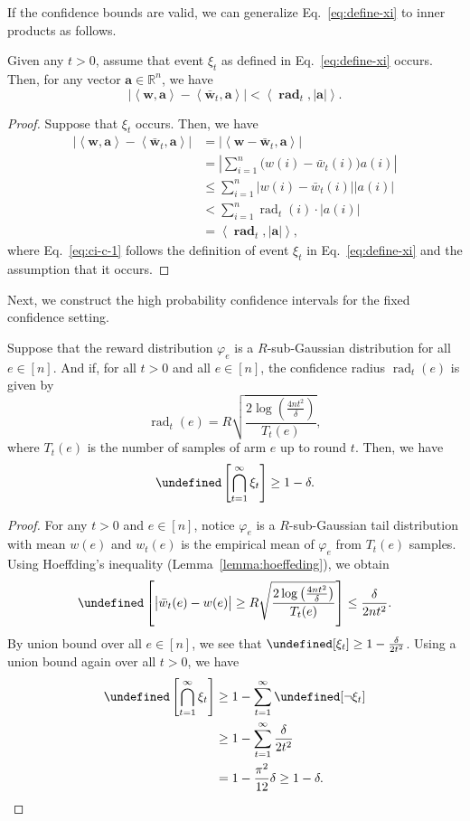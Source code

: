 \documentclass{article}
\newcommand{\Rew}{\varphi}
\newcommand{\RR}{\mathbb R}
\DeclareMathOperator{\rad}{rad}
\let\Pr\undefined
\DeclareMathOperator{\Pr}{Pr}
\newcommand{\inn}[1]{\left\langle #1 \right\rangle}
\renewcommand{\vec}[1]{\boldsymbol{#1}}
\begin{document}
If the confidence bounds are valid, we can generalize Eq.~\eqref{eq:define-xi} to inner products as follows.
\begin{lemma}
\label{lemma:ci-property}
Given any $t>0$, assume that event $\xi_t$ as defined in Eq.~\eqref{eq:define-xi} occurs. 
Then, for any vector $\vec a \in \RR^n$, we have
$$
\big|\inn{\vec w,\vec a} - \inn{\vec {\bar w}_t, \vec a}\big| < \inn{\vec \rad_t, |\vec a|}.
$$
\end{lemma}

\begin{proof}
Suppose that $\xi_t$ occurs. Then, we have
\begin{align}
\big|\inn{\vec w,\vec a} - \inn{\vec {\bar w}_t, \vec a}\big| 
&=\big|\inn{\vec w-\vec {\bar w}_t,\vec a}\big| \nonumber \\
&=\left|\sum_{i=1}^n \big(w(i)-\bar w_t(i)\big) a(i)  \right| \nonumber \\
&\le\sum_{i=1}^n \big| w(i)-\bar w_t(i)\big| |a(i)| \nonumber \\
&< \sum_{i=1}^{n} \rad_t(i) \cdot |a(i)| \label{eq:ci-c-1}\\
&= \inn{\vec \rad_t,  |\vec a|}, \nonumber
\end{align}
where Eq.~\eqref{eq:ci-c-1} follows the definition of event $\xi_t$ in Eq.~\eqref{eq:define-xi} and the assumption that it occurs.
\end{proof}


Next, we construct the high probability confidence intervals for the fixed confidence setting.
\begin{lemma}
\label{lemma:ci}
Suppose that the reward distribution $\Rew_e$ is a $R$-sub-Gaussian distribution for all $e\in [n]$.
And if, for all $t>0$ and all $e\in [n]$, 
the confidence radius $\rad_t(e)$ is given by
$$
\rad_t(e) = R\sqrt{\frac{2\log\left(\frac{4n t^2}\delta\right)}{T_t(e)}},
$$
where $T_t(e)$ is the number of samples of arm $e$ up to round $t$.
Then, we have
$$
\Pr\left[\bigcap_{t=1}^\infty \xi_t \right] \ge 1-\delta.
$$
\end{lemma}

\begin{proof}
For any $t>0$ and $e\in [n]$, notice $\Rew_e$ is a $R$-sub-Gaussian tail distribution with mean $w(e)$ and $w_t(e)$ is the empirical mean of $\Rew_e$ from $T_t(e)$ samples. 
Using Hoeffding's inequality (Lemma~\ref{lemma:hoeffeding}), we obtain
$$
\Pr\left[ \big|\bar w_t(e)-w(e) \big| \ge R\sqrt{\frac{2\log\left(\frac{4n t^2}\delta\right)}{T_t(e)}} \right] \le \frac{\delta}{2nt^2}.
$$
By union bound over all $e\in [n]$, we see that $\Pr[\xi_t] \ge 1-\frac{\delta}{2t^2}$. 
Using a union bound again over all $t>0$, we have
\begin{align*}
\Pr\left[\bigcap_{t=1}^\infty \xi_t \right] &\ge 1-\sum_{t=1}^\infty \Pr[\neg \xi_t]\\
&\ge 1-\sum_{t=1}^\infty \frac{\delta}{2t^2}\\
&= 1-\frac{\pi^2}{12}\delta \ge 1-\delta.
\end{align*}
\end{proof}
\end{document}
